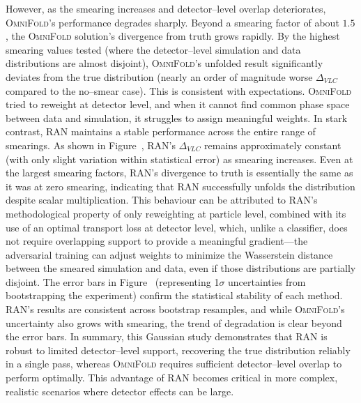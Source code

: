 {{        However, as the smearing increases and detector--level overlap deteriorates, \textsc{OmniFold}’s performance degrades sharply.
        Beyond a smearing factor of about $1.5$, the \textsc{OmniFold} solution’s divergence from truth grows rapidly.
        By the highest smearing values tested (where the detector--level simulation and data distributions are almost disjoint), \textsc{OmniFold}’s unfolded result significantly deviates from the true distribution (nearly an order of magnitude worse $\Delta_{VLC}$ compared to the no--smear case).
        This is consistent with expectations.
        \textsc{OmniFold} tried to reweight at detector level, and when it cannot find common phase space between data and simulation, it struggles to assign meaningful weights.
        In stark contrast, RAN maintains a stable performance across the entire range of smearings.
        As shown in Figure~, RAN's $\Delta_{VLC}$ remains approximately constant (with only slight variation within statistical error) as smearing increases.
        Even at the largest smearing factors, RAN's divergence to truth is essentially the same as it was at zero smearing, indicating that RAN successfully unfolds the distribution despite scalar multiplication.
        This behaviour can be attributed to RAN's methodological property of only reweighting at particle level, combined with its use of an optimal transport loss at detector level, which, unlike a classifier, does not require overlapping support to provide a meaningful gradient---the adversarial training can adjust weights to minimize the Wasserstein distance between the smeared simulation and data, even if those distributions are partially disjoint.
        The error bars in Figure~ (representing 1$\sigma$ uncertainties from bootstrapping the experiment) confirm the statistical stability of each method.
        RAN’s results are consistent across bootstrap resamples, and while \textsc{OmniFold}’s uncertainty also grows with smearing, the trend of degradation is clear beyond the error bars.
        In summary, this Gaussian study demonstrates that RAN is robust to limited detector--level support, recovering the true distribution reliably in a single pass, whereas \textsc{OmniFold} requires sufficient detector--level overlap to perform optimally. This advantage of RAN becomes critical in more complex, realistic scenarios where detector effects can be large.
}}

